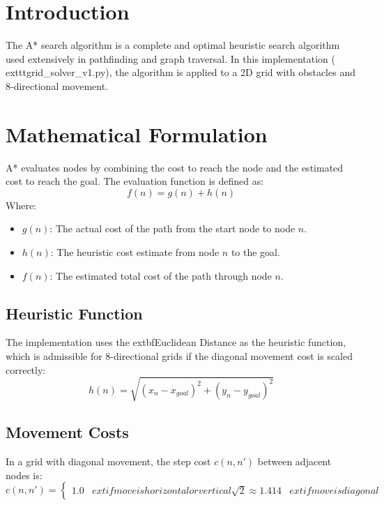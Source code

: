 \documentclass[12pt]{article}
\author{AI Lab - Assignment 3}
\date{	oday}
\begin{document}
\maketitle

\section{Introduction}
The A* search algorithm is a complete and optimal heuristic search algorithm used extensively in pathfinding and graph traversal. In this implementation (	exttt{grid\_solver\_v1.py}), the algorithm is applied to a 2D grid with obstacles and 8-directional movement.

\section{Mathematical Formulation}
A* evaluates nodes by combining the cost to reach the node and the estimated cost to reach the goal. The evaluation function is defined as:
\begin{equation}
    f(n) = g(n) + h(n)
\end{equation}
Where:
\begin{itemize}
    \item $g(n)$: The actual cost of the path from the start node to node $n$.
    \item $h(n)$: The heuristic cost estimate from node $n$ to the goal.
    \item $f(n)$: The estimated total cost of the path through node $n$.
\end{itemize}

\subsection{Heuristic Function}
The implementation uses the 	extbf{Euclidean Distance} as the heuristic function, which is admissible for 8-directional grids if the diagonal movement cost is scaled correctly:
\begin{equation}
    h(n) = \sqrt{(x_n - x_{goal})^2 + (y_n - y_{goal})^2}
\end{equation}

\subsection{Movement Costs}
In a grid with diagonal movement, the step cost $c(n, n')$ between adjacent nodes is:
\begin{equation}
    c(n, n') = 
    \begin{cases} 
    1.0 & 	ext{if move is horizontal or vertical} 
    \sqrt{2} \approx 1.414 & 	ext{if move is diagonal}
    \end{cases}
\end{equation}
\end{document}
